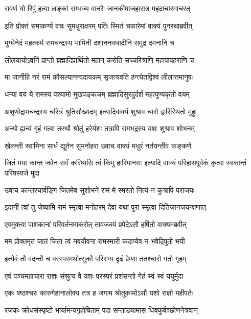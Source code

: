 \twolineshloka
{रावणं यो रिपुं हत्वा लङ्कां सम्भज्य वानरैः}
{जानकीमाजहारात्र महदाचारमाचरत्}%

\twolineshloka
{इति प्रोक्तं समाकर्ण्य वचः सुमधुराक्षरम्}
{पतिः स्मितं चकारेमां वाक्यं पुनरथाब्रवीत्}%

\twolineshloka
{मुग्धेनेदं महत्कर्म रामचन्द्रस्य भामिनी}
{दशाननवधादीनि समुद्र दमनानि च}%

\twolineshloka
{लीलयायोऽवनिं प्राप्तो ब्रह्मादिप्रार्थितो महान्}
{करोति सच्चरित्राणि महापापहराणि च}%

\twolineshloka
{मा जानीहि नरं रामं कौसल्यानन्ददायकम्}
{सृजत्यवति हन्त्येतद्विश्वं लीलात्तमानुषः}%

\twolineshloka
{धन्या वयं ये रामस्य पश्यामो मुखपङ्कजम्}
{ब्रह्मादिसुरदुर्दर्शं महत्पुण्यकृतो वयम्}%

\twolineshloka
{अशृणोद्रामचन्द्रस्य चरित्रं श्रुतिसौख्यदम्}
{इत्यादिवाक्यं शुश्राव चारो द्वारिस्थितो मुहुः}%

\twolineshloka
{अन्यो ह्यन्यं गृहं गत्वा तस्थौ श्रोतुं हरेर्यशः}
{तत्रापि रामभद्रस्य यशः शुश्राव शोभनम्}%

\twolineshloka
{खेलन्ती स्वामिना सार्धं द्यूतेन सुमनोहरा}
{उवाच वाक्यं मधुरं नर्तयन्तीव कङ्कणे}%

\fourlineindentedshloka
{जितं मया कान्त जवेन सर्वं}
{करिष्यसि त्वं किमु हारिमानसः}
{इत्यादि वाक्यं परिहासपूर्वकं}
{कृत्वा स्वकान्तं परिषस्वजे मुदा}%

\twolineshloka
{उवाच कान्तश्चार्वङ्गि जितमेव सुशोभने}
{रामं मे स्मरतो नित्यं न कुत्रापि पराजयः}%

\twolineshloka
{इदानीं त्वां तु जेष्यामि रामं स्मृत्वा मनोहरम्}
{देवा यथा पुरा स्मृत्वा दितिजानजयन्क्षणात्}%

\twolineshloka
{एवमुक्त्वा पाशकानां परिवर्तनमाकरोत्}
{तावज्जयं प्रपेदेऽसौ हर्षितो वाक्यमब्रवीत्}%

\twolineshloka
{मम प्रोक्तमृतं जातं जिता त्वं नवयौवना}
{रामस्मारी कदाप्येव न भवेद्रिपुतो भयी}%

\twolineshloka
{इत्येवं तौ वदन्तौ च परस्परमथोत्सुकौ}
{परिरभ्य दृढं प्रेम्णा ततश्चारो गतो गृहम्}%

\twolineshloka
{एवं पञ्चमहाचारा राज्ञः संश्रुत्य वै यशः}
{परस्परं प्रशंसन्तो गेहं स्वं स्वं ययुर्मुदा}%

\twolineshloka
{एकः षष्ठश्चरः कारुगेहानालोक्य तत्र ह}
{जगाम श्रोतुकामोऽसौ यशो राज्ञो महीपतेः}%

\twolineshloka
{रजकः क्रोधसंस्पृष्टो भार्यामन्यगृहोषिताम्}
{पदा सन्ताडयामास धिक्कुर्वञ्छोणनेत्रवान्}%


